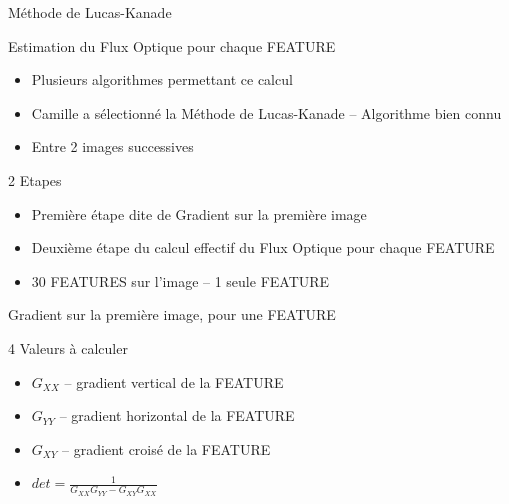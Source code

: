 \documentclass{bredelebeamer}
\begin{document}

\begin{frame}{Méthode de Lucas-Kanade}

\begin{block}{Estimation du Flux Optique pour chaque FEATURE}
\begin{itemize}
	\item Plusieurs algorithmes permettant ce calcul
	\item Camille a sélectionné la Méthode de Lucas-Kanade -- Algorithme bien connu
	\item Entre 2 images successives
\end{itemize}
\end{block}

\begin{exampleblock}{2 Etapes}
\begin{itemize}
	\item Première étape dite de Gradient sur la première image
	\item Deuxième étape du calcul effectif du Flux Optique pour chaque FEATURE
	\item 30 FEATURES sur l'image -- 1 seule FEATURE
\end{itemize}
\end{exampleblock}

\end{frame}


\begin{frame}{Gradient sur la première image, pour une FEATURE}

	\begin{block}{4 Valeurs à calculer}
\begin{itemize}
	\item $G_{XX}$ -- gradient vertical de la FEATURE
	\item $G_{YY}$ -- gradient horizontal de la FEATURE
	\item $G_{XY}$ -- gradient croisé de la FEATURE
	\item $det = \frac{1}{G_{XX}G_{YY}-G_{XY}G_{XX}}$
\end{itemize}
\end{block}



\end{frame}
\end{document}
